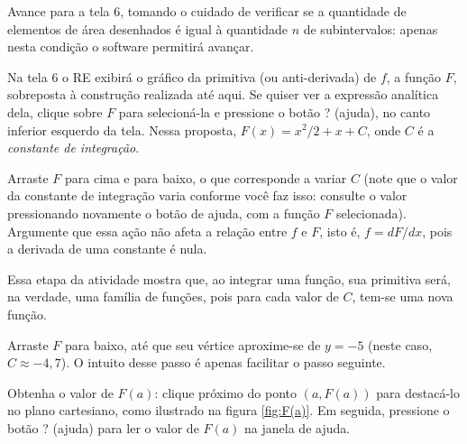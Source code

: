 \documentclass[a4paper,12pt]{scrartcl}
\begin{document}
\begin{compactenum}
      Avance para a tela 6, tomando o cuidado de verificar se a quantidade de elementos de área desenhados é igual à quantidade $n$ de subintervalos: apenas nesta condição o software permitirá avançar.
      
      \item Na tela 6 o RE exibirá o gráfico da primitiva (ou anti-derivada) de $f$, a função $F$, sobreposta à construção realizada até aqui. Se quiser ver a expressão analítica dela, clique sobre $F$ para selecioná-la e pressione o botão ? (ajuda), no canto inferior esquerdo da tela. Nessa proposta, $F(x) = x^2/2 + x + C$, onde $C$ é a \emph{constante de integração}.
      
      \item Arraste $F$ para cima e para baixo, o que corresponde a variar $C$ (note que o valor da constante de integração varia conforme você faz isso: consulte o valor pressionando novamente o botão de ajuda, com a função $F$ selecionada). Argumente que essa ação não afeta a relação entre $f$ e $F$, isto é, $f = dF/dx$, pois a derivada de uma constante é nula.
      
      Essa etapa da atividade mostra que, ao integrar uma função, sua primitiva será, na verdade, uma família de funções, pois para cada valor de $C$, tem-se uma nova função.
      
      \item \label{step:C} Arraste $F$ para baixo, até que seu vértice aproxime-se de $y = -5$ (neste caso, $C \approx -4,7$). O intuito desse passo é apenas facilitar o passo seguinte.
      
      \item Obtenha o valor de $F(a)$: clique próximo do ponto $\left(a,F(a)\right)$ para destacá-lo no plano cartesiano, como ilustrado na figura \ref{fig:F(a)}. Em seguida, pressione o botão ? (ajuda) para ler o valor de $F(a)$ na janela de ajuda.
      

\end{compactenum}
\end{document}
